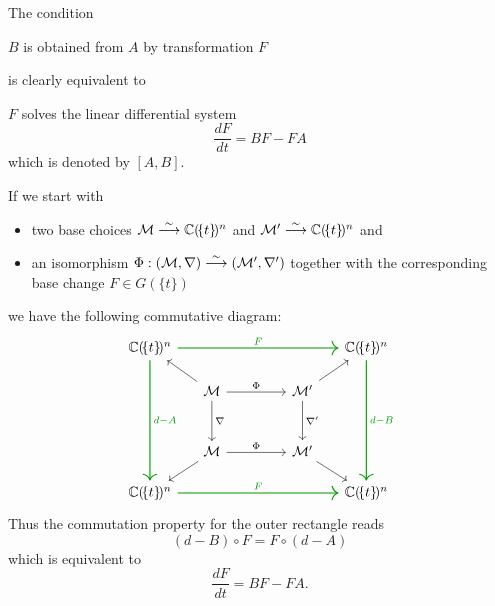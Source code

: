 \begin{rem}
  The condition
  \begin{einr}
    $B$ is obtained from $A$ by transformation $F$
  \end{einr}
  is clearly equivalent to
  \begin{einr}
    $F$ solves the linear differential system
    \[
      \frac{dF}{dt}=BF-FA
    \]
    which is denoted by $[A,B]$.
  \end{einr}
  \begin{s-rem}
    If we start with
    \begin{itemize}
      \item two base choices $\mathcal{M}\overset{\sim}\longrightarrow\mathbb{C}(\!\{t\}\!)^n$
        and $\mathcal{M}'\overset{\sim}\longrightarrow\mathbb{C}(\!\{t\}\!)^n$ and
      \item an isomorphism
        $\Phi:(\mathcal{M},\nabla)\overset{\sim}\longrightarrow(\mathcal{M}',\nabla')$ together
        with the corresponding base change $F\in G(\!\{t\}\!)$
    \end{itemize}
    we have the following commutative diagram:
    \[ \begin{tikzcd}[column sep=.5cm,row sep=.5cm]
        \C(\!\{t\}\!)^n
        \arrow[green!60!black,thick]{rrrrr}{F}
        \arrow[green!60!black,thick]{dddd}{d-A}&&&&&
          \C(\!\{t\}\!)^n\arrow[green!60!black,thick]{dddd}{d-B}
          \\ & \cM \arrow{dd}{\nabla}\arrow{rrr}{\Phi}\ular&&&
          \cM'\arrow{dd}{\nabla'}\urar
          \\
        \\ & \cM \arrow{rrr}{\Phi}\dlar&&& \cM'\drar
        \\ \C(\!\{t\}\!)^n \arrow[green!60!black,thick]{rrrrr}{F}&&&&&
          \C(\!\{t\}\!)^n
    \end{tikzcd} \]
    Thus the commutation property for the outer rectangle reads
    \[
      (d-B)\circ F=F\circ(d-A)
    \]
    which is equivalent to
    \[
      \frac{dF}{dt}=BF-FA.
    \]
  \end{s-rem}
\end{rem}
